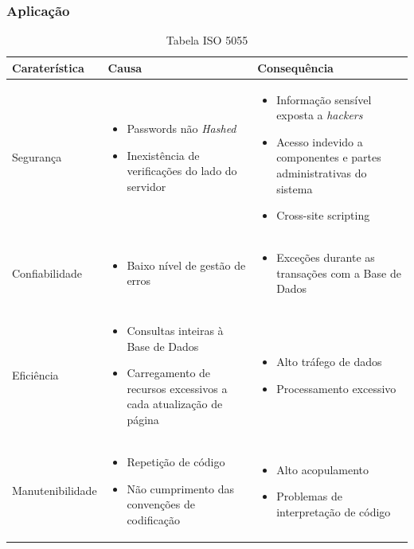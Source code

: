 \documentclass[a4paper,12pt]{article} %
\begin{document}
\subsubsection{Aplicação}
\begin{table}[H]
	\centering
	\begin{tabular}{|l|m{6cm}|m{6cm}|}
		\hline
		\textbf{Caraterística} & \textbf{Causa}  & \textbf{Consequência}\\
		\hline
		Segurança &
		\begin{itemize}
			\item Passwords não \textit{Hashed}
			\item Inexistência de verificações do lado do servidor
		\end{itemize} &
		\begin{itemize}
			\item Informação sensível exposta a \textit{hackers}
			\item Acesso indevido a componentes e partes administrativas do sistema
			\item Cross-site scripting
		\end{itemize} \\
		\hline
		Confiabilidade &
		\begin{itemize}
			\item Baixo nível de gestão de erros\footnotemark
		\end{itemize} &
		\begin{itemize}
			\item Exceções durante as transações com a Base de Dados
		\end{itemize} \\
		\hline
		Eficiência &
		\begin{itemize}
			\item Consultas inteiras à Base de Dados
			\item Carregamento de recursos excessivos a cada atualização de página
		\end{itemize} &
		\begin{itemize}
			\item Alto tráfego de dados
			\item Processamento excessivo
		\end{itemize} \\
		\hline
		Manutenibilidade &
		\begin{itemize}
			\item Repetição de código
			\item Não cumprimento das convenções de codificação
		\end{itemize} &
		\begin{itemize}
			\item Alto acopulamento
			\item Problemas de interpretação de código
		\end{itemize} \\
		\hline
	\end{tabular}
	\caption{Tabela ISO 5055}
\end{table}
\end{document}
